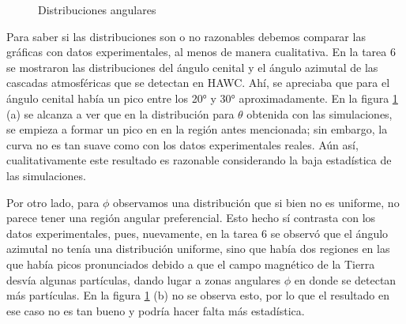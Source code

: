 \documentclass[11pt]{article}
\begin{document}
\begin{figure}[H]
\centering
{}

\caption{Distribuciones angulares}
\label{fig:Prob3}
\end{figure}
Para saber si las distribuciones son o no razonables debemos comparar las gráficas con datos experimentales, al menos de manera cualitativa. En la tarea 6 se mostraron las distribuciones del ángulo cenital y el ángulo azimutal de las cascadas atmosféricas que se detectan en HAWC. Ahí, se apreciaba que para el ángulo cenital había un pico entre los 20° y 30° aproximadamente. En la figura \ref{fig:Prob3} (a) se alcanza a ver que en la distribución para $\theta$ obtenida con las simulaciones, se empieza a formar un pico en en la región antes mencionada; sin embargo, la curva no es tan suave como con los datos experimentales reales. Aún así, cualitativamente este resultado es razonable  considerando la baja estadística de las simulaciones. 

\hspace{5mm}Por otro lado, para $\phi$ observamos una distribución que si bien no es uniforme, no parece tener una región angular preferencial. Esto hecho sí contrasta con los datos experimentales, pues, nuevamente, en la tarea 6 se observó que el ángulo azimutal no tenía una distribución uniforme, sino que había dos regiones en las que había picos pronunciados debido a que el campo magnético de la Tierra desvía algunas partículas, dando lugar a zonas angulares $\phi$ en donde se detectan más partículas. En la figura \ref{fig:Prob3} (b) no se observa esto, por lo que el resultado en ese caso no es tan bueno y podría hacer falta más estadística.
\end{document}
